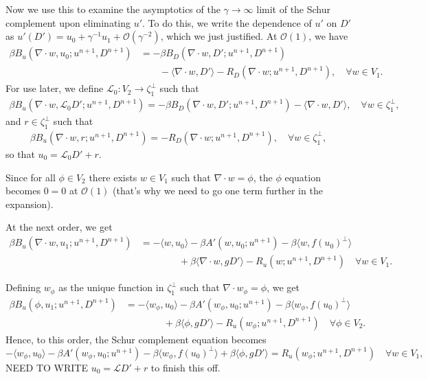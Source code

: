 \documentclass{article}
\begin{document}
Now we use this to examine the asymptotics of the $\gamma\to \infty$
limit of the Schur complement upon eliminating $u'$. To do this, we
write the dependence of $u'$ on $D'$ as $u'(D') =u_0 + \gamma^{-1} u_1
+ \mathcal{O}(\gamma^{-2})$, which we just justified. At
$\mathcal{O}(1)$, we have
\begin{align}
  \nonumber \beta B_u(\nabla\cdot w, u_0; u^{n+1},D^{n+1}) & = - \beta
  B_D(\nabla\cdot w, D'; u^{n+1},D^{n+1}) \\ & \qquad -\langle
  \nabla\cdot w, D' \rangle -R_D(\nabla\cdot w;u^{n+1},D^{n+1}), \quad
  \forall w\in V_1.
\end{align}
For use later, we define $\mathcal{L}_0:V_2 \to \zeta_1^\perp$ such that
\begin{align}
  \nonumber \beta B_u(\nabla\cdot w, \mathcal{L}_0D'; u^{n+1},D^{n+1})  = - \beta
  B_D(\nabla\cdot w, D'; u^{n+1},D^{n+1}) -\langle
  \nabla\cdot w, D' \rangle, \quad
  \forall w\in \zeta_1^\perp, 
\end{align}
and $r\in \zeta_1^\perp$ such that
\begin{align}
  \nonumber \beta B_u(\nabla\cdot w, r; u^{n+1},D^{n+1}) =
  -R_D(\nabla\cdot w;u^{n+1},D^{n+1}), \quad
  \forall w\in \zeta_1^\perp,
\end{align}
so that $u_0 = \mathcal{L}_0D' + r$.

Since for all $\phi\in V_2$ there exists $w\in V_1$ such that
$\nabla\cdot w = \phi$, the $\phi$ equation becomes $0=0$ at
$\mathcal{O}(1)$ (that's why we need to go one term further in the
expansion).

At the next order, we get
\begin{align}
  \nonumber
  \beta B_u(\nabla\cdot w, u_1; u^{n+1},D^{n+1})
  & = 
  -\langle w, u_0 \rangle - \beta A'(w, u_0; u^{n+1})
  - \beta\langle w, f(u_0)^{\perp}\rangle \\
  & \qquad\qquad
  + \beta\langle \nabla\cdot w, gD'\rangle
  -R_u(w;u^{n+1},D^{n+1})
  \quad \forall w \in V_1.
\end{align}

Defining $w_\phi$ as the unique function in $\zeta_1^{\perp}$ such
that $\nabla\cdot w_\phi=\phi$, we get
\begin{align}
  \nonumber
  \beta B_u(\phi, u_1; u^{n+1},D^{n+1})
  & = 
  -\langle w_{\phi}, u_0 \rangle - \beta A'(w_\phi, u_0; u^{n+1})
  - \beta\langle w_\phi, f(u_0)^{\perp}\rangle \\
  & \qquad\qquad
  + \beta\langle \phi, gD'\rangle
  -R_u(w_\phi;u^{n+1},D^{n+1})
  \quad \forall \phi \in V_2.
\end{align}
Hence, to this order, the Schur complement equation becomes
\begin{equation}
    -\langle w_{\phi}, u_0 \rangle - \beta A'(w_\phi, u_0; u^{n+1})
  - \beta\langle w_\phi, f(u_0)^{\perp}\rangle
  + \beta\langle \phi, gD'\rangle
   = R_u(w_\phi;u^{n+1},D^{n+1})
  \quad \forall w \in V_1,
\end{equation}
NEED TO WRITE $u_0 = \mathcal{L}D' + r$ to finish this off.
\end{document}
